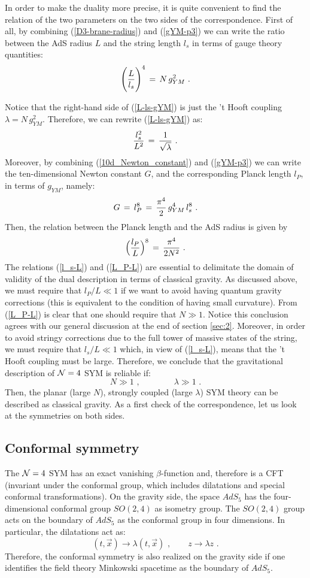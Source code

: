 \documentclass[12pt,notitlepage,a4paper]{article}
\newcommand{\beq}{\begin{equation}}
\newcommand{\eeq}{\end{equation}}
\begin{document}
In order to make the duality  more precise, it is quite convenient to find the relation of the two parameters on the two sides of the correspondence. First of all, by combining (\ref{D3-brane-radius}) and (\ref{gYM-p3}) we can write the ratio between the AdS radius $L$ and the string length $l_s$ in terms of gauge theory quantities:
\beq
\Bigg({L\over l_s}\Bigg)^4 \,=\,N\,g^2_{YM}\,\,.
\label{L-ls-gYM}
\eeq




Notice that the  right-hand side of (\ref{L-ls-gYM}) is just the 't Hooft coupling $\lambda=N\,g^2_{YM}$. Therefore, we can rewrite (\ref{L-ls-gYM}) as:
\beq
{l_s^2\over L^2}\,=\,{1\over \sqrt{\lambda}}\,\,.
\label{l_s-L}
\eeq
Moreover, by combining (\ref{10d_Newton_constant}) and (\ref{gYM-p3}) we can write the ten-dimensional Newton constant $G$, and the corresponding Planck length $l_P$, in terms of $g_{YM}$, namely:
\beq
G\,=\,l_P^8\,=\, {\pi^4\over 2}\,g^4_{YM}\,l_s^8\,\,.
\eeq
Then, the relation between the Planck length and the AdS radius is given by
\beq
\Big({l_P\over L}\Big)^8\,=\,{\pi^4\over 2 N^2}\,\,.
\label{L_P-L}
\eeq
The relations (\ref{l_s-L}) and (\ref{L_P-L}) are essential to delimitate the domain of validity of the dual description in terms of {\rm classical} gravity.  As discussed above, we must require that $l_P/ L\ll 1$ if we want to avoid having quantum gravity corrections (this is equivalent to the condition of having small curvature). From (\ref{L_P-L}) is clear that one should require that $N\gg 1$. Notice this conclusion agrees with our general discussion at the end of section \ref{sec:2}. Moreover, in order to avoid stringy corrections due to the full tower of massive states of the string, we must require that
$l_s/ L\ll 1$ which, in view of (\ref{l_s-L}), means that the 't Hooft coupling must be large.  
Therefore, we conclude that the gravitational description of ${\cal N}=4$ SYM is reliable if:
\beq
N\gg 1\,\,,
\qquad\qquad
\lambda \gg 1\,\,.
\eeq
Then, the planar (large $N$), strongly coupled (large $\lambda$) SYM theory can be described as classical gravity. As a first check of the correspondence, let us look at the symmetries on both sides.
 
 \subsection{Conformal symmetry}
 
 
 The ${\cal N}=4$ SYM has an exact vanishing $\beta$-function and, therefore  is a CFT (invariant under the conformal group, which includes dilatations and special conformal transformations). On the gravity side, the space $AdS_5$ has the four-dimensional conformal group $SO(2,4)$  as isometry group. The $SO(2,4)$ group acts on the boundary  of $AdS_5$  as the conformal group in four dimensions. In particular, the dilatations act as:
 \beq
 (t,\vec x)\to \lambda  (t,\vec x)\,\,,
 \qquad
 z\to \lambda z\,\,.
 \eeq
 Therefore, the conformal symmetry is also realized on the gravity side if one identifies the field theory Minkowski spacetime as the boundary of $AdS_5$. 
 
\end{document}
